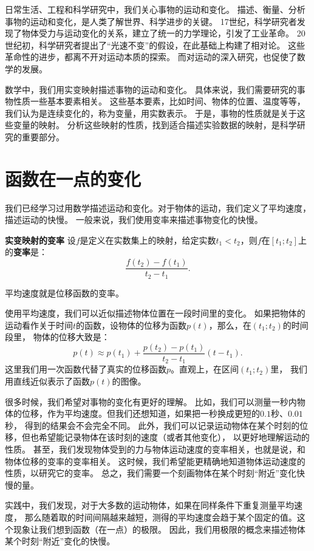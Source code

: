 \documentclass[12pt,UTF8]{ctexbook}
\begin{document}
日常生活、工程和科学研究中，我们关心事物的运动和变化。
描述、衡量、分析事物的运动和变化，是人类了解世界、科学进步的关键。
17世纪，科学研究者发现了物体受力与运动变化的关系，建立了统一的力学理论，引发了工业革命。
20世纪初，科学研究者提出了“光速不变”的假设，在此基础上构建了相对论。
这些革命性的进步，都离不开对运动本质的探索。
而对运动的深入研究，也促使了数学的发展。

数学中，我们用实变映射描述事物的运动和变化。
具体来说，我们需要研究的事物性质一些基本要素相关。
这些基本要素，比如时间、物体的位置、温度等等，我们认为是连续变化的，称为变量，用实数表示。
于是，事物的性质就是关于这些变量的映射。
分析这些映射的性质，找到适合描述实验数据的映射，是科学研究的重要部分。

\section{函数在一点的变化}
我们已经学习过用数学描述运动和变化。对于物体的运动，我们定义了平均速度，描述运动的快慢。
一般来说，我们使用变率来描述事物变化的快慢。
\begin{df}{\textbf{实变映射的变率}}
    设$f$是定义在实数集上的映射，给定实数$t_1 < t_2$，则$f$在$[t_1;t_2]$上的\textbf{变率}是：
    $$ \frac{f(t_2) - f(t_1)}{t_2 - t_1}.$$
\end{df}

平均速度就是位移函数的变率。

使用平均速度，我们可以近似描述物体位置在一段时间里的变化。
如果把物体的运动看作关于时间$t$的函数，设物体的位移为函数$p(t)$，那么，在$(t_1; t_2)$的时间段里，
物体的位移大致是：
$$ p(t) \approx p(t_1) + \frac{p(t_2) - p(t_1)}{t_2 - t_1}(t - t_1).$$
这里我们用一次函数代替了真实的位移函数$p$。直观上，在区间$(t_1; t_2)$里，
我们用直线近似表示了函数$p(t)$的图像。

很多时候，我们希望对事物的变化有更好的理解。
比如，我们可以测量一秒内物体的位移，作为平均速度。但我们还想知道，如果把一秒换成更短的$0.1$秒、$0.01$秒，
得到的结果会不会完全不同。
此外，我们可以记录运动物体在某个时刻的位移，但也希望能记录物体在该时刻的速度（或者其他变化），
以更好地理解运动的性质。
甚至，我们发现物体受到的力与物体运动速度的变率相关，也就是说，和物体位移的变率的变率相关。
这时候，我们希望能更精确地知道物体运动速度的性质，以研究它的变率。
总之，我们需要一个刻画物体在某个时刻“附近”变化快慢的量。

实践中，我们发现，对于大多数的运动物体，如果在同样条件下重复测量平均速度，
那么随着取的时间间隔越来越短，测得的平均速度会趋于某个固定的值。这个现象让我们想到函数（在一点）的极限。
因此，我们用极限的概念来描述物体某个时刻“附近”变化的快慢。
\end{document}
